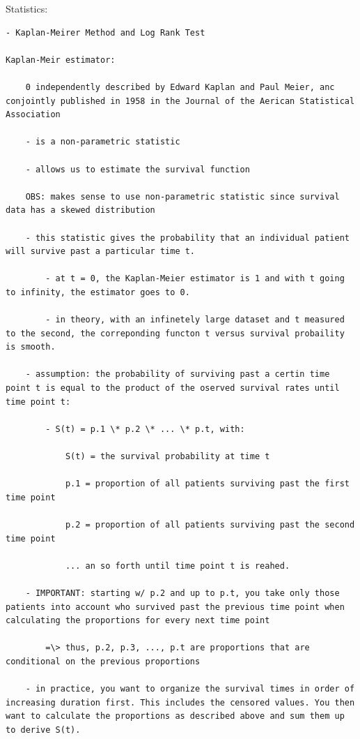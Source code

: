 \documentclass[
]{book}
\begin{document}
Statistics:

\begin{verbatim}
- Kaplan-Meirer Method and Log Rank Test

Kaplan-Meir estimator:

    0 independently described by Edward Kaplan and Paul Meier, anc conjointly published in 1958 in the Journal of the Aerican Statistical Association

    - is a non-parametric statistic

    - allows us to estimate the survival function

    OBS: makes sense to use non-parametric statistic since survival data has a skewed distribution

    - this statistic gives the probability that an individual patient will survive past a particular time t.

        - at t = 0, the Kaplan-Meier estimator is 1 and with t going to infinity, the estimator goes to 0.

        - in theory, with an infinetely large dataset and t measured to the second, the correponding functon t versus survival probaility is smooth.

    - assumption: the probability of surviving past a certin time point t is equal to the product of the oserved survival rates until time point t:

        - S(t) = p.1 \* p.2 \* ... \* p.t, with:

            S(t) = the survival probability at time t

            p.1 = proportion of all patients surviving past the first time point

            p.2 = proportion of all patients surviving past the second time point

            ... an so forth until time point t is reahed.

    - IMPORTANT: starting w/ p.2 and up to p.t, you take only those patients into account who survived past the previous time point when calculating the proportions for every next time point

        =\> thus, p.2, p.3, ..., p.t are proportions that are conditional on the previous proportions

    - in practice, you want to organize the survival times in order of increasing duration first. This includes the censored values. You then want to calculate the proportions as described above and sum them up to derive S(t).


\end{verbatim}
\end{document}
